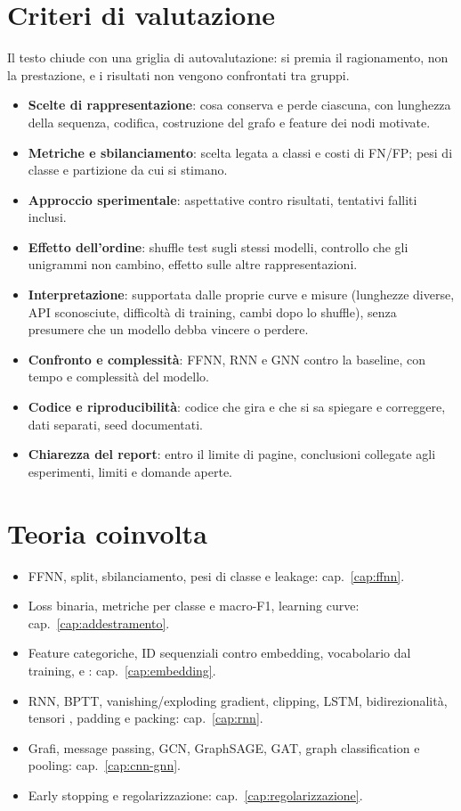\section{Criteri di valutazione}
Il testo chiude con una griglia di autovalutazione: si premia il ragionamento, non la prestazione, e
i risultati non vengono confrontati tra gruppi.
\begin{itemize}
  \item \textbf{Scelte di rappresentazione}: cosa conserva e perde ciascuna, con lunghezza della
        sequenza, codifica, costruzione del grafo e feature dei nodi motivate.
  \item \textbf{Metriche e sbilanciamento}: scelta legata a classi e costi di FN/FP; pesi di classe
        e partizione da cui si stimano.
  \item \textbf{Approccio sperimentale}: aspettative contro risultati, tentativi falliti inclusi.
  \item \textbf{Effetto dell'ordine}: shuffle test sugli stessi modelli, controllo che gli unigrammi
        non cambino, effetto sulle altre rappresentazioni.
  \item \textbf{Interpretazione}: supportata dalle proprie curve e misure (lunghezze diverse, API
        sconosciute, difficoltà di training, cambi dopo lo shuffle), senza presumere che un modello
        debba vincere o perdere.
  \item \textbf{Confronto e complessità}: FFNN, RNN e GNN contro la baseline, con tempo e
        complessità del modello.
  \item \textbf{Codice e riproducibilità}: codice che gira e che si sa spiegare e correggere,
        dati separati, seed documentati.
  \item \textbf{Chiarezza del report}: entro il limite di pagine, conclusioni collegate agli
        esperimenti, limiti e domande aperte.
\end{itemize}

\section{Teoria coinvolta}
\begin{itemize}
  \item FFNN, split, sbilanciamento, pesi di classe e leakage: cap.~\ref{cap:ffnn}.
  \item Loss binaria, metriche per classe e macro-F1, learning curve: cap.~\ref{cap:addestramento}.
  \item Feature categoriche, ID sequenziali contro embedding, vocabolario dal training,
         e : cap.~\ref{cap:embedding}.
  \item RNN, BPTT, vanishing/exploding gradient, clipping, LSTM, bidirezionalità, tensori
        , padding e packing: cap.~\ref{cap:rnn}.
  \item Grafi, message passing, GCN, GraphSAGE, GAT, graph classification e pooling:
        cap.~\ref{cap:cnn-gnn}.
  \item Early stopping e regolarizzazione: cap.~\ref{cap:regolarizzazione}.
\end{itemize}

